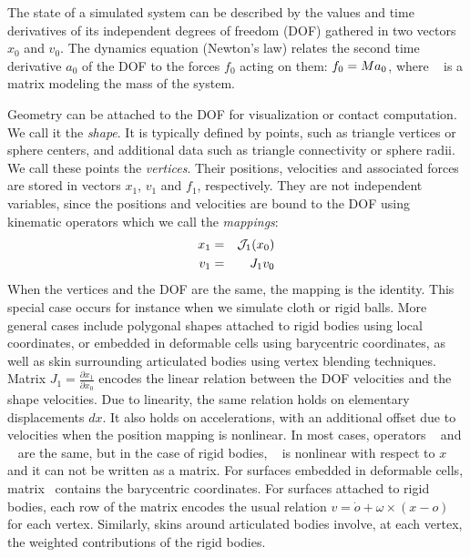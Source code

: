 The state of a simulated system can be described by the values and time derivatives of its independent degrees of freedom (DOF) gathered in two vectors $x_0$ and $v_0$.
The dynamics equation (Newton's law) relates the second time derivative $a_0$ of the DOF to the forces $f_0$ acting on them: $f_0 = M a_0$, where \mass~ is a matrix modeling the mass of the system.

Geometry can be attached to the DOF for visualization or contact computation. 
We call it the \textit{shape}.
It is typically defined by points, such as triangle vertices or sphere centers, and additional data such as triangle connectivity or sphere radii.
We call these points the \textit{vertices}. 
Their positions, velocities and associated forces are stored in vectors $x_1$, $v_1$ and $f_1$, respectively.
They are not independent variables, since the positions and velocities are bound to the DOF using kinematic operators which we call the \textit{mappings}:
\begin{eqnarray*} %
x_1 &=&\JNL_1(x_0)\\ 
v_1 &=& J_1 v_0
\end{eqnarray*}
When the vertices and the DOF are the same, the mapping is the identity.
This special case occurs for instance when we simulate cloth or rigid balls.
More general cases include polygonal shapes attached to rigid bodies using local coordinates, or embedded in deformable cells using barycentric coordinates, as well as skin surrounding articulated bodies using vertex blending techniques.
Matrix $J_1 = \frac{\partial x_1}{\partial x_0}$ encodes the linear relation between the DOF velocities and the shape velocities. Due to linearity, the same relation holds on elementary displacements $dx$.
It also holds on accelerations, with an additional offset due to velocities when the position mapping \JNL is nonlinear.
In most cases, operators \JNL~ and \J~ are the same, but in the case of rigid bodies, \JNL~ is nonlinear with respect to $x$ and it can not be written as a matrix.
For surfaces embedded in deformable cells, matrix \J~contains the barycentric coordinates. 
For surfaces attached to rigid bodies, each row of the matrix encodes the usual relation $v = \dot o + \omega \times (x-o)$ for each vertex. 
Similarly, skins around articulated bodies involve, at each vertex, the weighted  contributions of the rigid bodies. 


